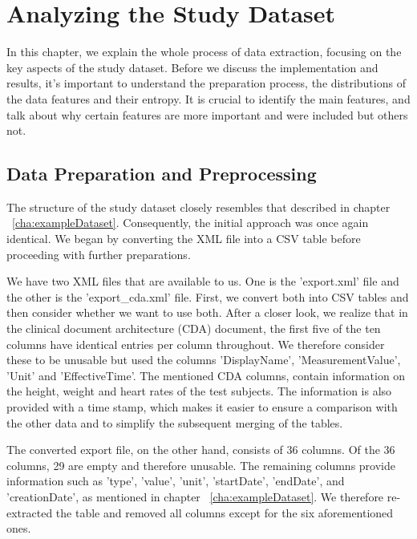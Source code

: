 \chapter{Analyzing the Study Dataset}
\label{cha:studyDataSet}

In this chapter, we explain the whole process of data extraction, focusing on the key aspects of the study dataset. Before we discuss the implementation and results, it's important to understand the preparation process, the distributions of the data features and their entropy. It is crucial to identify the main features, and talk about why certain features are more important and were included but others not.

\section{Data Preparation and Preprocessing}

The structure of the study dataset closely resembles that described in chapter ~\ref{cha:exampleDataset}. Consequently, the initial approach was once again identical. We began by converting the XML file into a CSV table before proceeding with further preparations. 

We have two XML files that are available to us. One is the 'export.xml' file and the other is the 'export\_cda.xml' file. First, we convert both into CSV tables and then consider whether we want to use both. After a closer look, we realize that in the clinical document architecture (CDA) document, the first five of the ten columns have identical entries per column throughout. We therefore consider these to be unusable but used the columns 'DisplayName', 'MeasurementValue', 'Unit' and 'EffectiveTime'. The mentioned CDA columns, contain information on the height, weight and heart rates of the test subjects. The information is also provided with a time stamp, which makes it easier to ensure a comparison with the other data and to simplify the subsequent merging of the tables. 

The converted export file, on the other hand, consists of 36 columns. Of the 36 columns, 29 are empty and therefore unusable. The remaining columns provide information such as 'type', 'value', 'unit', 'startDate', 'endDate', and 'creationDate', as mentioned in chapter ~\ref{cha:exampleDataset}. We therefore re-extracted the table and removed all columns except for the six aforementioned ones.

